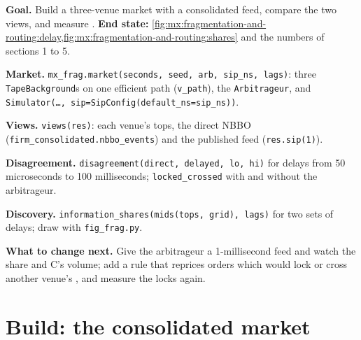 \begin{tutorial}
\textbf{Goal.} Build a three-venue market with a consolidated feed, compare the two views, and measure .
\textbf{End state:} \cref{fig:mx:fragmentation-and-routing:delay,fig:mx:fragmentation-and-routing:shares} and the numbers of sections 1 to 5.
\begin{tutsteps}
\item \textbf{Market.} \texttt{mx\_frag.market(seconds, seed, arb, sip\_ns, lags)}: three \texttt{TapeBackground}s on one efficient path
(\texttt{v\_path}), the \texttt{Arbitrageur}, and \texttt{Simulator(\dots, sip=SipConfig(default\_ns=sip\_ns))}.
\item \textbf{Views.} \texttt{views(res)}: each venue's tops, the direct NBBO (\texttt{firm\_consolidated.nbbo\_events}) and the published feed
(\texttt{res.sip(1)}).
\item \textbf{Disagreement.} \texttt{disagreement(direct, delayed, lo, hi)} for delays from 50 microseconds to 100 milliseconds;
\texttt{locked\_crossed} with and without the arbitrageur.
\item \textbf{Discovery.} \texttt{information\_shares(mids(tops, grid), lags)} for two sets of delays; draw with \texttt{fig\_frag.py}.
\end{tutsteps}
\textbf{What to change next.} Give the arbitrageur a 1-millisecond feed and watch the  share and C's volume; add a rule that reprices orders which
would lock or cross another venue's , and measure the locks again.
\end{tutorial}

\section{Build: the consolidated market}\label{bld:mx:fragmentation-and-routing:consolidated}

